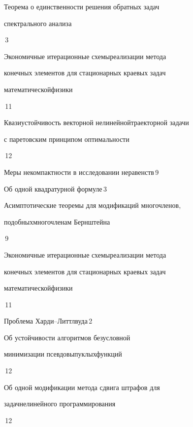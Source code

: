 

{Теорема о единственности решения обратных задач\newline


спектрального анализа}{\No\,3}




{Экономичные итерационные схемы\newline реализации метода 


конечных элементов для стационарных краевых задач 


математической\newline физики}{\No\,11}




{Квазиустойчивость векторной нелинейной\newline траекторной задачи


с паретовским принципом оптимальности}{\No\,12}




{Меры некомпактности в исследовании неравенств}{\No\,9}




{Об одной квадратурной формуле}{\No\,3}




{Асимптотические теоремы для модификаций многочленов, 


подобных\newline многочленам Бернштейна}{\No\,9}




{Экономичные итерационные схемы\newline реализации метода 


конечных элементов для стационарных краевых задач 


математической\newline физики}{\No\,11}




{Проблема Харди--Литтлвуда}{\No\,2}




{Об устойчивости алгоритмов безусловной


минимизации псевдовыпуклых\newline функций}{\No\,12}




{Об одной модификации метода сдвига штрафов для 


задач\newline нелинейного программирования}{\No\,12}


